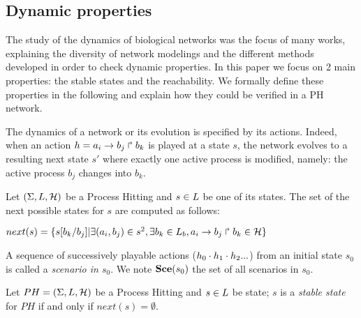 \subsection*{Dynamic properties}

The study of the dynamics of biological networks was the focus of many works, explaining the diversity of network modelings and the different methods developed in order to check dynamic properties.
In this paper we focus on 2 main properties: the stable states and the reachability.
We formally define these properties in the following and explain how they could be verified in a PH network.

The dynamics of a network or its evolution is specified by its actions.
Indeed, when an action $h = a_i\rightarrow b_j\Rsh b_k$ is played at a state $s$,
the network evolves to a resulting next state $s'$ where exactly one active process
is modified, namely: the active process $b_j$ changes into $b_k$.


\begin{definition}
\label{def:NextState}
Let $(\Sigma,L,\mathcal{H})$ be a Process Hitting and $s \in L$ be
one of its states. The set of the next possible states for $s$ are computed as follows:
\begin{center}
$next(s) = \{s[b_k /b_j ]| \exists (a_i , b_j ) \in s^2 , \exists b_k \in L_b , a_i\rightarrow b_j\Rsh b_k \in \mathcal{H}\}$
\end{center}
 
\end{definition}

A sequence of successively playable actions ($h_0 \cdot h_1 \cdot h_2...$)
from an initial state $s_0$ is called a \emph{scenario in $s_0$}.
We note $\mathbf{Sce}(s_0)$ the set of all scenarios in $s_0$.


\begin{definition}
\label{def:FixPoint1}
Let $PH = (\Sigma,L,\mathcal{H})$ be a Process Hitting and
$s \in L$ be state;
$s$ is a \emph{stable state} for $PH$ if and only if $next(s) = \emptyset $.
\end{definition}

